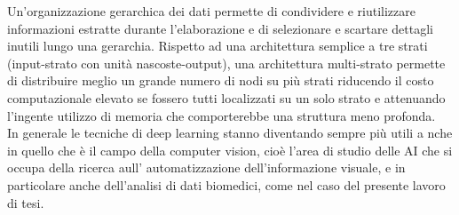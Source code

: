 Un’organizzazione gerarchica dei dati permette di condividere e riutilizzare informazioni
 estratte durante l’elaborazione e di selezionare e scartare dettagli inutili lungo una gerarchia.
  Rispetto ad una architettura semplice a tre strati (input-strato con unità nascoste-output),
   una architettura multi-strato permette di distribuire meglio un grande numero di nodi 
   su più strati riducendo il costo computazionale elevato se fossero tutti localizzati
    su un solo strato e attenuando l’ingente utilizzo di memoria che comporterebbe una 
    struttura meno profonda. \\ 
    In generale le tecniche di deep learning stanno diventando sempre più utili a
    nche in quello che è il campo della computer vision, 
    cioè l'area di studio delle AI che si occupa della ricerca aull' automatizzazione 
    dell'informazione visuale, e in particolare anche dell'analisi di dati biomedici,
     come nel caso del presente lavoro di tesi.\\
    
